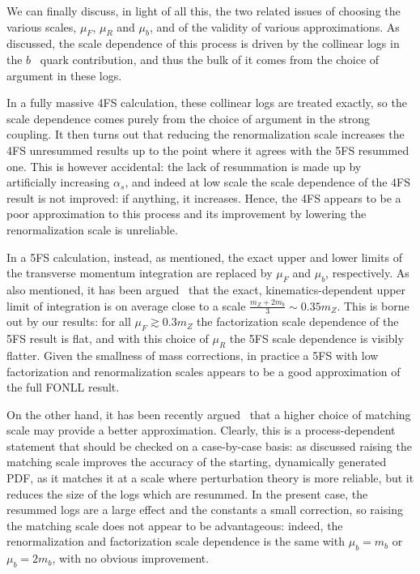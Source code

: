 \documentclass[12pt]{article}
\begin{document}
We can finally discuss, in light of all this, the two related issues
of choosing the various scales, $\mu_F$, $\mu_R$ and $\mu_b$, and of
the validity of various approximations. As discussed, the scale
dependence of this process is driven by the collinear logs in the
$b$~ quark contribution, and thus the bulk of it comes from the
choice of argument in these logs. 

In a fully massive 4FS calculation,
these collinear logs are treated exactly, so the scale dependence
comes purely from the choice of argument in the strong coupling. It
then turns out that reducing the renormalization scale increases the
4FS unresummed results up to the point where it agrees with the 5FS
resummed one. This is however accidental: the lack of resummation is made up
by artificially increasing $\alpha_s$, and indeed at low scale the
scale dependence of the 4FS result is not improved: if anything, it
increases. Hence, the 4FS appears to be a poor approximation to this
process and its improvement by lowering the renormalization scale  is
unreliable.

In a 5FS calculation, instead, as mentioned, the exact upper and lower
limits of the transverse momentum integration are replaced by $\mu_F$
and $\mu_b$, respectively. As also mentioned, it has been
argued~\cite{Maltoni:2012pa,Lim:2016wjo} 
that the exact, kinematics-dependent upper limit of integration is
on average close to a scale $\frac{m_Z+2m_b}{3}\sim 0.35m_Z$. This is
borne out by our results: for all $\mu_F\gtrsim0.3m_Z$ the 
factorization scale dependence of the 5FS result is flat, and with
this choice of $\mu_R$ the 5FS scale dependence is visibly
flatter. Given the smallness of mass
corrections, in practice a 5FS with low factorization and
renormalization scales appears to be a good approximation of the full
FONLL result.

On the other hand, it has been recently argued~\cite{Bertone:2017djs}
that a higher choice of matching scale may provide a better
approximation. Clearly, this is a process-dependent statement that
should be checked on a case-by-case basis: as discussed raising the
matching scale improves the accuracy of the starting, dynamically
generated PDF, as it matches it at a scale where perturbation theory
is more reliable, but it reduces the size of the logs which are
resummed. In the present case, the resummed logs are a large effect
and the constants a small correction, so raising the matching scale
does not appear to be advantageous: indeed, the renormalization and
factorization scale dependence is the same with $\mu_b=m_b$ or
$\mu_b=2m_b$, with no obvious improvement. 
\end{document}
